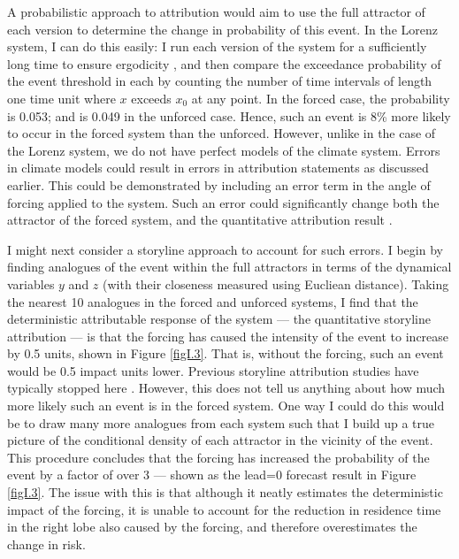   A probabilistic approach to attribution would aim to use the full attractor of each version to determine the change in probability of this event. In the Lorenz system, I can do this easily: I run each version of the system for a sufficiently long time to ensure ergodicity \citep[here 10 million time units,][]{atencia_analogs_2017}, and then compare the exceedance probability of the event threshold in each by counting the number of time intervals of length one time unit where $x$ exceeds $x_0$ at any point. In the forced case, the probability is 0.053; and is 0.049 in the unforced case. Hence, such an event is 8\% more likely to occur in the forced system than the unforced. However, unlike in the case of the Lorenz system, we do not have perfect models of the climate system. Errors in climate models could result in errors in attribution statements as discussed earlier. This could be demonstrated by including an error term in the angle of forcing applied to the system. Such an error could significantly change both the attractor of the forced system, and the quantitative attribution result \citep{palmer_nonlinear_1999}.

  I might next consider a storyline approach to account for such errors. I begin by finding analogues of the event within the full attractors in terms of the dynamical variables $y$ and $z$ (with their closeness measured using Eucliean distance). Taking the nearest 10 analogues in the forced and unforced systems, I find that the deterministic attributable response of the system --- the quantitative storyline attribution --- is that the forcing has caused the intensity of the event to increase by 0.5 units, shown in Figure \ref{figI.3}. That is, without the forcing, such an event would be 0.5 impact units lower. Previous storyline attribution studies have typically stopped here \citep{van_garderen_methodology_2021,benitez_july_2022,van_garderen_storyline_2022}. However, this does not tell us anything about how much more likely such an event is in the forced system. One way I could do this would be to draw many more analogues from each system such that I build up a true picture of the conditional density of each attractor in the vicinity of the event. This procedure concludes that the forcing has increased the probability of the event by a factor of over 3 --- shown as the lead=0 forecast result in Figure \ref{figI.3}. The issue with this is that although it neatly estimates the deterministic impact of the forcing, it is unable to account for the reduction in residence time in the right lobe also caused by the forcing, and therefore overestimates the change in risk.

